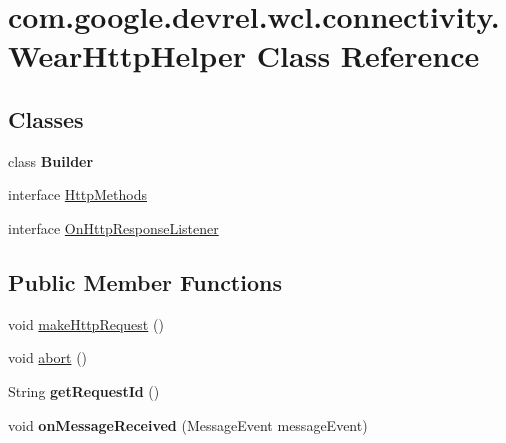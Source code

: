\hypertarget{classcom_1_1google_1_1devrel_1_1wcl_1_1connectivity_1_1WearHttpHelper}{}\section{com.\+google.\+devrel.\+wcl.\+connectivity.\+Wear\+Http\+Helper Class Reference}
\label{classcom_1_1google_1_1devrel_1_1wcl_1_1connectivity_1_1WearHttpHelper}
\subsection*{Classes}
\begin{DoxyCompactItemize}
\item 
class {\bfseries Builder}
\item 
interface \hyperlink{interfacecom_1_1google_1_1devrel_1_1wcl_1_1connectivity_1_1WearHttpHelper_1_1HttpMethods}{Http\+Methods}
\item 
interface \hyperlink{interfacecom_1_1google_1_1devrel_1_1wcl_1_1connectivity_1_1WearHttpHelper_1_1OnHttpResponseListener}{On\+Http\+Response\+Listener}
\end{DoxyCompactItemize}
\subsection*{Public Member Functions}
\begin{DoxyCompactItemize}
\item 
void \hyperlink{classcom_1_1google_1_1devrel_1_1wcl_1_1connectivity_1_1WearHttpHelper_a30289c98f40b25eb5143659d566f4a0d}{make\+Http\+Request} ()
\item 
void \hyperlink{classcom_1_1google_1_1devrel_1_1wcl_1_1connectivity_1_1WearHttpHelper_ad2050198ddc73e312e09d7de551e71df}{abort} ()
\item 
String {\bfseries get\+Request\+Id} ()\hypertarget{classcom_1_1google_1_1devrel_1_1wcl_1_1connectivity_1_1WearHttpHelper_ad289d1658154fd86be13419c25b6e186}{}\label{classcom_1_1google_1_1devrel_1_1wcl_1_1connectivity_1_1WearHttpHelper_ad289d1658154fd86be13419c25b6e186}

\item 
void {\bfseries on\+Message\+Received} (Message\+Event message\+Event)\hypertarget{classcom_1_1google_1_1devrel_1_1wcl_1_1connectivity_1_1WearHttpHelper_ab33193699dcc205967f24f2a8f6eee73}{}\label{classcom_1_1google_1_1devrel_1_1wcl_1_1connectivity_1_1WearHttpHelper_ab33193699dcc205967f24f2a8f6eee73}

\end{DoxyCompactItemize}
